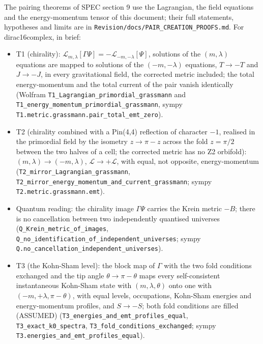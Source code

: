 \documentclass[11pt]{article}
\begin{document}
The pairing theorems of SPEC section 9 use the Lagrangian, the field equations and the energy-momentum tensor of this document; their full statements, hypotheses and limits are in \texttt{Revision\allowbreak{}/docs/PA\allowbreak{}IR\_CREAT\allowbreak{}ION\_PROO\allowbreak{}FS.md}. For dirac16complex, in brief:

\begin{itemize}
\item T1 (chirality): $\mathcal{L}_{m,\lambda}[\Gamma\Psi] = -\mathcal{L}_{-m,-\lambda}[\Psi]$, solutions of the $(m, \lambda)$ equations are mapped to solutions of the $(-m, -\lambda)$ equations, $T \to -T$ and $J \to -J$, in every gravitational field, the corrected metric included; the total energy-momentum and the total current of the pair vanish identically (Wolfram \texttt{T1\_Lagra\allowbreak{}ngian\_pr\allowbreak{}imordial\allowbreak{}\_grassma\allowbreak{}nn} and \texttt{T1\_energ\allowbreak{}y\_moment\allowbreak{}um\_primo\allowbreak{}rdial\_gr\allowbreak{}assmann}, sympy \texttt{T1.metri\allowbreak{}c.grassm\allowbreak{}ann.pair\allowbreak{}\_total\_e\allowbreak{}mt\_zero}).
\item T2 (chirality combined with a Pin(4,4) reflection of character $-1$, realised in the primordial field by the isometry $z \to \pi - z$ across the fold $z = \pi/2$ between the two halves of a cell; the corrected metric has no Z2 orbifold): $(m, \lambda) \to (-m, \lambda)$, $\mathcal{L} \to +\mathcal{L}$, with equal, not opposite, energy-momentum (\texttt{T2\_mirro\allowbreak{}r\_Lagran\allowbreak{}gian\_gra\allowbreak{}ssmann}, \texttt{T2\_mirro\allowbreak{}r\_energy\allowbreak{}\_momentu\allowbreak{}m\_and\_cu\allowbreak{}rrent\_gr\allowbreak{}assmann}; sympy \texttt{T2.metri\allowbreak{}c.grassm\allowbreak{}ann.emt}).
\item Quantum reading: the chirality image $\Gamma\Psi$ carries the Krein metric $-B$; there is no cancellation between two independently quantised universes (\texttt{Q\_Krein\_\allowbreak{}metric\_o\allowbreak{}f\_images}, \texttt{Q\_no\_ide\allowbreak{}ntificat\allowbreak{}ion\_of\_i\allowbreak{}ndepende\allowbreak{}nt\_unive\allowbreak{}rses}; sympy \texttt{Q.no\_can\allowbreak{}cellatio\allowbreak{}n\_indepe\allowbreak{}ndent\_un\allowbreak{}iverses}).
\item T3 (the Kohn-Sham level): the block map of $\Gamma$ with the two fold conditions exchanged and the tip angle $\theta \to \pi - \theta$ maps every self-consistent instantaneous Kohn-Sham state with $(m, \lambda, \theta)$ onto one with $(-m, +\lambda, \pi - \theta)$, with equal levels, occupations, Kohn-Sham energies and energy-momentum profiles, and $S \to -S$; both fold conditions are filled (ASSUMED) (\texttt{T3\_energ\allowbreak{}ies\_and\_\allowbreak{}emt\_prof\allowbreak{}iles\_equ\allowbreak{}al}, \texttt{T3\_exact\allowbreak{}\_k0\_spec\allowbreak{}tra}, \texttt{T3\_fold\_\allowbreak{}conditio\allowbreak{}ns\_excha\allowbreak{}nged}; sympy \texttt{T3.energ\allowbreak{}ies\_and\_\allowbreak{}emt\_prof\allowbreak{}iles\_equ\allowbreak{}al}).

\end{itemize}
\end{document}
